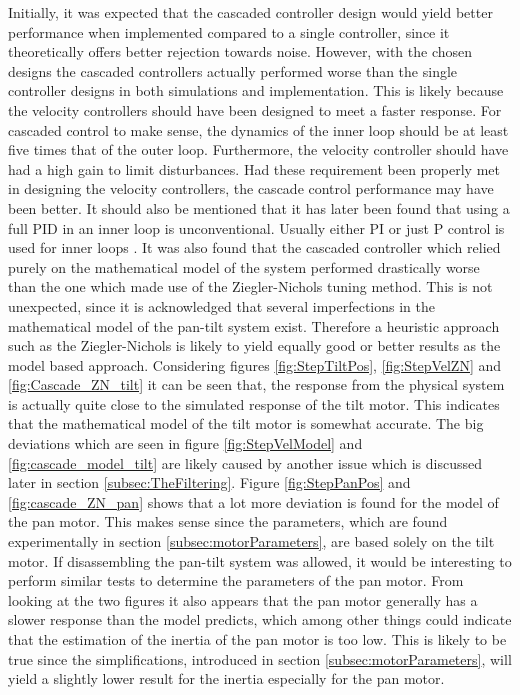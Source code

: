 \documentclass[../../main.tex]{subfiles}
\begin{document}
Initially, it was expected that the cascaded controller design would yield better performance when implemented compared to a single controller, since it theoretically offers better rejection towards noise. However, with the chosen designs the cascaded controllers actually performed worse than the single controller designs in both simulations and implementation. This is likely because the velocity controllers should have been designed to meet a faster response. For cascaded control to make sense, the dynamics of the inner loop should be at least five times that of the outer loop. Furthermore, the velocity controller should have had a high gain to limit disturbances. Had these requirement been properly met in designing the velocity controllers, the cascade control performance may have been better. It should also be mentioned that it has later been found that using a full PID in an inner loop is unconventional. Usually either PI or just P control is used for inner loops \cite{}.
It was also found that the cascaded controller which relied purely on the mathematical model of the system performed drastically worse than the one which made use of the Ziegler-Nichols tuning method. This is not unexpected, since it is acknowledged that several imperfections in the mathematical model of the pan-tilt system exist. Therefore a heuristic approach such as the Ziegler-Nichols is likely to yield equally good or better results as the model based approach. Considering figures \ref{fig:StepTiltPos}, \ref{fig:StepVelZN} and \ref{fig:Cascade_ZN_tilt} it can be seen that, the response from the physical system is actually quite close to the simulated response of the tilt motor. This indicates that the mathematical model of the tilt motor is somewhat accurate. The big deviations which are seen in figure \ref{fig:StepVelModel} and \ref{fig:cascade_model_tilt} are likely caused by another issue which is discussed later in section \ref{subsec:TheFiltering}. Figure \ref{fig:StepPanPos} and \ref{fig:cascade_ZN_pan} shows that a lot more deviation is found for the model of the pan motor. This makes sense since the parameters, which are found experimentally in section \ref{subsec:motorParameters}, are based solely on the tilt motor. If disassembling the pan-tilt system was allowed, it would be interesting to perform similar tests to determine the parameters of the pan motor. From looking at the two figures it also appears that the pan motor generally has a slower response than the model predicts, which among other things could indicate that the estimation of the inertia of the pan motor is too low. This is likely to be true since the simplifications, introduced in section \ref{subsec:motorParameters}, will yield a slightly lower result for the inertia especially for the pan motor.
\end{document}
